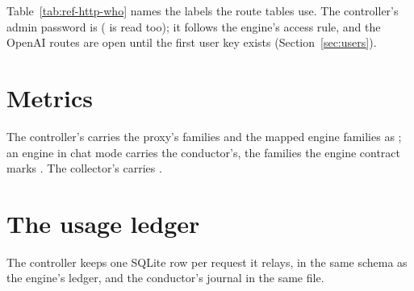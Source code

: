 Table~\ref{tab:ref-http-who} names the labels the route tables use. The controller's admin password is  ( is read too); it follows the engine's access rule, and the OpenAI routes are open until the first user key exists (Section~\ref{sec:users}).













\section{Metrics}

The controller's  carries the proxy's families and the mapped engine families as ; an engine in chat mode carries the conductor's, the families the engine contract marks . The collector's  carries .



\section{The usage ledger}\label{sec:ledger}

The controller keeps one SQLite row per request it relays, in the same schema as the engine's ledger, and the conductor's journal in the same file.


